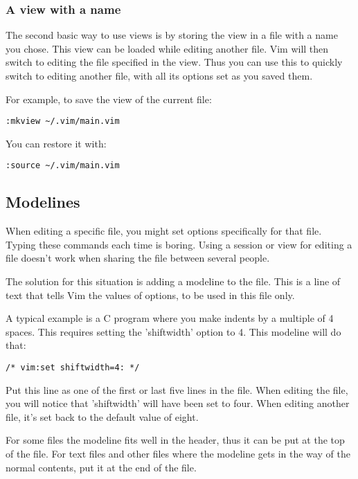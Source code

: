 \subsubsection{A view with a name}
The second basic way to use views is by storing the view in a file with a name you chose.
This view can be loaded while editing another file.
Vim will then switch to editing the file specified in the view.
Thus you can use this to quickly switch to editing another file, with all its options set as you saved them.

For example, to save the view of the current file:

\begin{Verbatim}[samepage=true]
 :mkview ~/.vim/main.vim
\end{Verbatim}

You can restore it with:

\begin{Verbatim}[samepage=true]
 :source ~/.vim/main.vim
\end{Verbatim}
\subsection{Modelines}
When editing a specific file, you might set options specifically for that file.
Typing these commands each time is boring.
Using a session or view for editing a file doesn't work when sharing the file between several people.

The solution for this situation is adding a modeline to the file.
This is a line of text that tells Vim the values of options, to be used in this file only.

A typical example is a C program where you make indents by a multiple of 4 spaces.
This requires setting the 'shiftwidth' option to 4.
This modeline will do that:

\begin{Verbatim}[samepage=true]
    /* vim:set shiftwidth=4: */ 
\end{Verbatim}

Put this line as one of the first or last five lines in the file.
When editing the file, you will notice that 'shiftwidth' will have been set to four.
When editing another file, it's set back to the default value of eight.

For some files the modeline fits well in the header, thus it can be put at the top of the file.
For text files and other files where the modeline gets in the way of the normal contents, put it at the end of the file.

